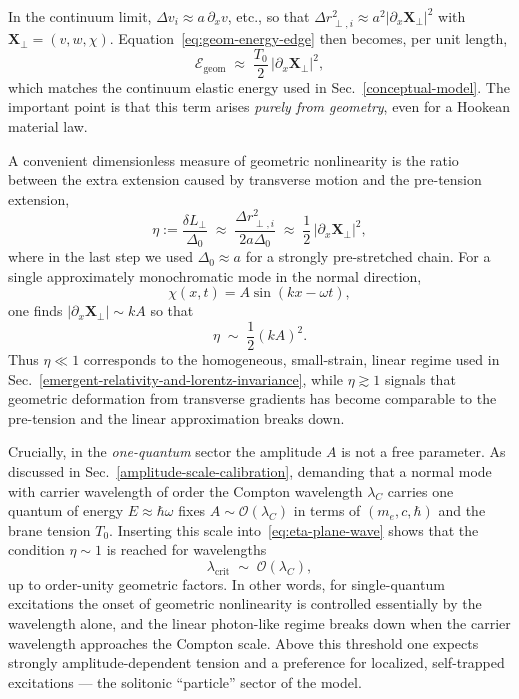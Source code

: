 In the continuum limit, $\Delta v_i \approx a\,\partial_x v$, etc., so that
$\Delta r_{\perp,i}^2 \approx a^2 |\partial_x \mathbf X_\perp|^2$ with
$\mathbf X_\perp = (v,w,\chi)$. Equation~\eqref{eq:geom-energy-edge} then
becomes, per unit length,
\begin{equation}
  \mathcal E_{\text{geom}}
  \;\approx\;
  \frac{T_0}{2}\,|\partial_x \mathbf X_\perp|^2,
\end{equation}
which matches the continuum elastic energy used in
Sec.~\ref{conceptual-model}. The important point is that this term arises
\emph{purely from geometry}, even for a Hookean material law.

A convenient dimensionless measure of geometric nonlinearity is the ratio
between the extra extension caused by transverse motion and the pre-tension
extension,
\begin{equation}
  \eta
  := \frac{\delta L_{\perp}}{\Delta_0}
  \;\approx\;
  \frac{\Delta r_{\perp,i}^2}{2a\Delta_0}
  \;\approx\;
  \frac{1}{2}\,|\partial_x \mathbf X_\perp|^2,
  \label{eq:eta-definition}
\end{equation}
where in the last step we used $\Delta_0 \approx a$ for a strongly pre-stretched
chain. For a single approximately monochromatic mode in the normal direction,
\[
  \chi(x,t) = A \sin(kx - \omega t),
\]
one finds $|\partial_x \mathbf X_\perp| \sim kA$ so that
\begin{equation}
  \eta \;\sim\; \frac{1}{2}(kA)^2.
  \label{eq:eta-plane-wave}
\end{equation}
Thus $\eta \ll 1$ corresponds to the homogeneous, small-strain, linear regime
used in Sec.~\ref{emergent-relativity-and-lorentz-invariance}, while
$\eta \gtrsim 1$ signals that geometric deformation from transverse gradients
has become comparable to the pre-tension and the linear approximation breaks
down.

Crucially, in the \emph{one-quantum} sector the amplitude $A$ is not a free
parameter. As discussed in Sec.~\ref{amplitude-scale-calibration}, demanding
that a normal mode with carrier wavelength of order the Compton wavelength
$\lambda_C$ carries one quantum of energy $E \approx \hbar\omega$ fixes
$A \sim \mathcal O(\lambda_C)$ in terms of $(m_e,c,\hbar)$ and the brane
tension $T_0$. Inserting this scale into~\eqref{eq:eta-plane-wave} shows that
the condition $\eta \sim 1$ is reached for wavelengths
\begin{equation}
  \lambda_{\text{crit}}
  \;\sim\;
  \mathcal O(\lambda_C),
\end{equation}
up to order-unity geometric factors. In other words, for single-quantum
excitations the onset of geometric nonlinearity is controlled essentially
by the wavelength alone, and the linear photon-like regime breaks down when
the carrier wavelength approaches the Compton scale. Above this threshold one
expects strongly amplitude-dependent tension and a preference for localized,
self-trapped excitations --- the solitonic ``particle'' sector of the model.

